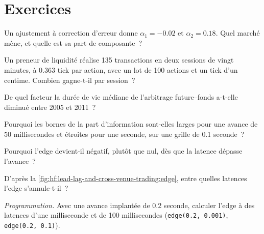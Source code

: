 \section{Exercices}

\begin{exercise}[$\star$]\label{exo:hf:lead-lag-and-cross-venue-trading:1}
Un ajustement à correction d'erreur donne $\alpha_1=-0.02$ et $\alpha_2=0.18$. Quel marché mène, et quelle est sa part de composante~?
\end{exercise}

\begin{exercise}[$\star$]\label{exo:hf:lead-lag-and-cross-venue-trading:2}
Un preneur de liquidité réalise 135 transactions en deux sessions de vingt minutes, à 0.363 tick par action, avec un lot de 100 actions et un tick d'un centime. Combien gagne-t-il
par session~?
\end{exercise}

\begin{exercise}[$\star$]\label{exo:hf:lead-lag-and-cross-venue-trading:3}
De quel facteur la durée de vie médiane de l'arbitrage future--fonds a-t-elle diminué entre 2005 et 2011~?
\end{exercise}

\begin{exercise}[$\star\star$]\label{exo:hf:lead-lag-and-cross-venue-trading:4}
Pourquoi les bornes de la part d'information sont-elles larges pour une avance de 50 millisecondes et étroites pour une seconde, sur une grille de 0.1 seconde~?
\end{exercise}

\begin{exercise}[$\star\star$]\label{exo:hf:lead-lag-and-cross-venue-trading:5}
Pourquoi l'edge devient-il négatif, plutôt que nul, dès que la latence dépasse l'avance~?
\end{exercise}

\begin{exercise}[$\star\star$]\label{exo:hf:lead-lag-and-cross-venue-trading:6}
D'après la \cref{fig:hf:lead-lag-and-cross-venue-trading:edge}, entre quelles latences l'edge s'annule-t-il~?
\end{exercise}

\begin{exercise}[$\star\star\star$]\label{exo:hf:lead-lag-and-cross-venue-trading:7}
\emph{Programmation.} Avec une avance implantée de 0.2 seconde, calculer l'edge à des latences d'une milliseconde et de 100 millisecondes (\texttt{edge(0.2, 0.001)},
\texttt{edge(0.2, 0.1)}).
\end{exercise}

